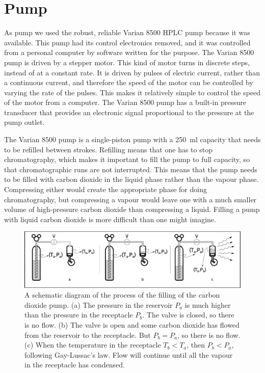 \section{Pump}
\label{sec:CO2Pump}

As pump we used the robust, reliable Varian 8500 HPLC pump because it was
available. This pump had its control electronics removed, and it was controlled
from a personal computer by software written for the purpose. The Varian 8500
pump is driven by a stepper motor. This kind of motor turns in discrete steps,
instead of at a constant rate. It is driven by pulses of electric current,
rather than a continuous current, and therefore the speed of the motor can be
controlled by varying the rate of the pulses. This makes it relatively simple to
control the speed of the motor from a computer. The Varian 8500 pump has a
built-in pressure transducer that provides an electronic signal proportional to
the pressure at the pump outlet.

The Varian 8500 pump is a single-piston pump with a \SI{250}{\milli\litre}
capacity that needs to be refilled between strokes. Refilling means that one has
to stop chromatography, which makes it important to fill the pump to full
capacity, so that chromatographic runs are not interrupted. This means that the
pump needs to be filled with carbon dioxide in the liquid phase rather than the
vapour phase. Compressing either would create the appropriate phase for doing
chromatography, but compressing a vapour would leave one with a much smaller
volume of high-pressure carbon dioxide than compressing a liquid. Filling a pump
with liquid carbon dioxide is more difficult than one might imagine.

\begin{figure}
\centering
\includegraphics[width=\textwidth]{Figures/CO2Filling.pdf}
\decoRule

\caption[Filling a CO\textsubscript{2} pump.]{A schematic diagram of the process
of the filling of the carbon dioxide pump. (a) The pressure in the reservoir
$P_a$ is much higher than the pressure in the receptacle $P_b$. The valve is
closed, so there is no flow. (b) The valve is open and some carbon dioxide has
flowed from the reservoir to the receptacle. But $P_b = P_a$, so there is no
flow. (c) When the temperature in the receptacle $T_b < T_a$, then $P_b  < P_a$,
following Gay-Lussac's law. Flow will continue until all the vapour in the
receptacle has condensed.}

\label{fig:co2fill}
\end{figure}


